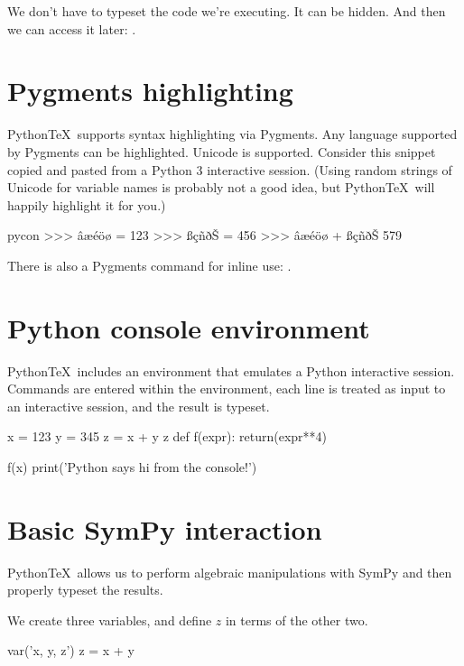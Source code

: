 \documentclass[11pt]{article}
\newcommand{\pytex}{Python\TeX}
\begin{document}
We don't have to typeset the code we're executing.  It can be hidden.  And then we can access it later:  .


\section{Pygments highlighting}

\pytex\ supports syntax highlighting via Pygments.  Any language supported by Pygments can be highlighted.  Unicode is supported.  Consider this snippet copied and pasted from a Python 3 interactive session.  (Using random strings of Unicode for variable names is probably not a good idea, but \pytex\ will happily highlight it for you.)

\begin{pygments}{pycon}
>>> âæéöø = 123
>>> ßçñðŠ = 456
>>> âæéöø + ßçñðŠ
579
\end{pygments}

There is also a Pygments command for inline use:  .


\section{Python console environment}

\pytex\ includes an environment that emulates a Python interactive session.  Commands are entered within the environment, each line is treated as input to an interactive session, and the result is typeset.

\begin{pyconsole}[][frame=single]
x = 123
y = 345
z = x + y
z
def f(expr):
    return(expr**4)

f(x)
print('Python says hi from the console!')
\end{pyconsole}


\section{Basic SymPy interaction}

\pytex\ allows us to perform algebraic manipulations with SymPy and then properly typeset the results.

We create three variables, and define $z$ in terms of the other two.

\begin{sympyblock}
var('x, y, z')
z = x + y
\end{sympyblock}
\end{document}
